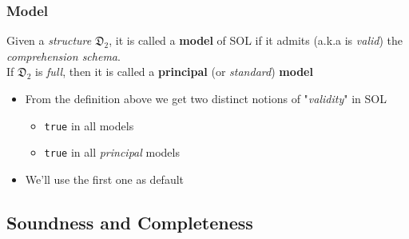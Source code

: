 \documentclass{beamer}
\begin{document}
                \begin{frame}
                    \frametitle{Model}
                    \begin{definition}[Model]
                        Given a \textit{structure} $ \mathfrak{D}_2 $, it is called a \textbf{model} of SOL if it admits (a.k.a is \textit{valid}) the \textit{comprehension schema}.\\
                        If $ \mathfrak{D}_2 $ is \textit{full}, then it is called a \textbf{principal} (or \textit{standard}) \textbf{model}
                    \end{definition}
                    \begin{itemize}
                        \item From the definition above we get two distinct notions of "\textit{validity}" in SOL
                              \begin{itemize}
                                \item \texttt{true} in all models
                                \item \texttt{true} in all \textit{principal} models
                              \end{itemize}
                        \item We'll use the first one as default
                    \end{itemize}
                \end{frame}

            \subsection{Soundness and Completeness}
\end{document}
